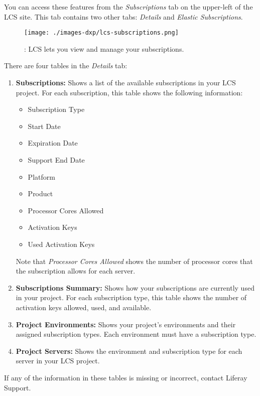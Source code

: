 You can access these features from the \emph{Subscriptions} tab on the
upper-left of the LCS site. This tab contains two other tabs:
\emph{Details} and \emph{Elastic Subscriptions}.

\begin{figure}
\centering
\texttt{[image: ./images-dxp/lcs-subscriptions.png]}
\caption{: LCS lets you view and manage your subscriptions.}
\end{figure}

There are four tables in the \emph{Details} tab:

\begin{enumerate}
\def\labelenumi{\arabic{enumi}.}
\item
  \textbf{Subscriptions:} Shows a list of the available subscriptions in
  your LCS project. For each subscription, this table shows the
  following information:

  \begin{itemize}
  \tightlist
  \item
    Subscription Type
  \item
    Start Date
  \item
    Expiration Date
  \item
    Support End Date
  \item
    Platform
  \item
    Product
  \item
    Processor Cores Allowed
  \item
    Activation Keys
  \item
    Used Activation Keys
  \end{itemize}

  Note that \emph{Processor Cores Allowed} shows the number of processor
  cores that the subscription allows for each server.
\item
  \textbf{Subscriptions Summary:} Shows how your subscriptions are
  currently used in your project. For each subscription type, this table
  shows the number of activation keys allowed, used, and available.
\item
  \textbf{Project Environments:} Shows your project's environments and
  their assigned subscription types. Each environment must have a
  subscription type.
\item
  \textbf{Project Servers:} Shows the environment and subscription type
  for each server in your LCS project.
\end{enumerate}

If any of the information in these tables is missing or incorrect,
contact Liferay Support.

